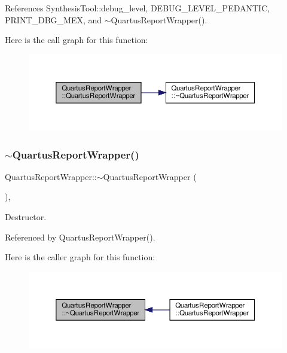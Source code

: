 References Synthesis\+Tool\+::debug\+\_\+level, D\+E\+B\+U\+G\+\_\+\+L\+E\+V\+E\+L\+\_\+\+P\+E\+D\+A\+N\+T\+IC, P\+R\+I\+N\+T\+\_\+\+D\+B\+G\+\_\+\+M\+EX, and $\sim$\+Quartus\+Report\+Wrapper().

Here is the call graph for this function\+:
\nopagebreak
\begin{figure}[H]
\begin{center}
\leavevmode
\includegraphics[width=350pt]{db/dc8/classQuartusReportWrapper_a9a9043401bdb33ab3f80648479fa603d_cgraph}
\end{center}
\end{figure}
\mbox{\label{classQuartusReportWrapper_a4a82080cddea0ca98b86c9c119c37fbc}} 
\subsubsection{\texorpdfstring{$\sim$\+Quartus\+Report\+Wrapper()}{~QuartusReportWrapper()}}
{\footnotesize\ttfamily Quartus\+Report\+Wrapper\+::$\sim$\+Quartus\+Report\+Wrapper (\begin{DoxyParamCaption}{ }\end{DoxyParamCaption})\hspace{0.3cm}{\ttfamily [override]}, {\ttfamily [default]}}



Destructor. 



Referenced by Quartus\+Report\+Wrapper().

Here is the caller graph for this function\+:
\nopagebreak
\begin{figure}[H]
\begin{center}
\leavevmode
\includegraphics[width=350pt]{db/dc8/classQuartusReportWrapper_a4a82080cddea0ca98b86c9c119c37fbc_icgraph}
\end{center}
\end{figure}


